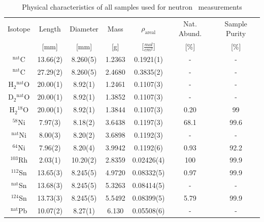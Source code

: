 \begin{table}[ht]
    \caption{Physical characteristics of all samples used for neutron \tot\
    measurements}
    \label{SampleCharacteristics}
    \begin{center}
        \begin{tabular}{ c c c c c c c }
            \hline
            Isotope & Length & Diameter
            & Mass & $\rho_{\text{areal}}$ & Nat. Abund. & Sample Purity\\
                 & [mm] & [mm] & [g] & [$\frac{mol}{cm^{2}}$] & [\%] & [\%]\\
            \hline

            $^{\text{nat}}$C & 13.66(2) & 8.260(5) & 1.2363
            & 0.1921(1) & - & -\\
            $^{\text{nat}}$C & 27.29(2) & 8.260(5) & 2.4680
            & 0.3835(2) & - & -\\

            H$_{2}$$^{\text{nat}}$O & 20.00(1) & 8.92(1) & 1.2461 & 0.1107(3) & - &
            - \\
            D$_{2}$$^{\text{nat}}$O & 20.00(1) & 8.92(1) & 1.3852 & 0.1107(3) & - &
            - \\
            H$_{2}$$^{18}$O & 20.00(1) & 8.92(1) & 1.3844 & 0.1107(3) & 0.20 & 99\\

            $^{58}$Ni & 7.97(3)& 8.18(2) &
            3.6438 & 0.1197(3)& 68.1 & 99.6 \\
            $^{\text{nat}}$Ni & 8.00(3) & 8.20(2) &
            3.6898 & 0.1192(3)& - & -\\
            $^{64}$Ni & 7.96(2) & 8.20(4) &
            3.9942 & 0.1192(6) & 0.93 & 92.2\\

            $^{103}$Rh & 2.03(1) & 10.20(2) & 2.8359 & 0.02426(4) & 100 & 99.9\\

            $^{112}$Sn & 13.65(3) & 8.245(5) &
            4.9720 & 0.08332(5) & 0.97 & 99.9\\
            $^{\text{nat}}$Sn & 13.68(3) & 8.245(5) &
            5.3263 & 0.08414(5) & - & -\\
            $^{124}$Sn & 13.73(3) & 8.245(5) &
            5.5492 & 0.08399(5) & 5.79 & 99.9\\

            $^{\text{nat}}$Pb & 10.07(2) & 8.27(1) & 6.130 &
            0.05508(6) & - & -\\

            \hline
        \end{tabular}
    \end{center}
\end{table}

